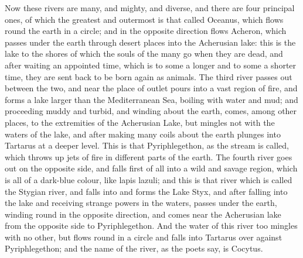 \documentclass[11pt,letter]{article}
\begin{document}
\par  Now these rivers are many, and mighty, and diverse, and there are four principal ones, of which the greatest and outermost is that called Oceanus, which flows round the earth in a circle; and in the opposite direction flows Acheron, which passes under the earth through desert places into the Acherusian lake: this is the lake to the shores of which the souls of the many go when they are dead, and after waiting an appointed time, which is to some a longer and to some a shorter time, they are sent back to be born again as animals. The third river passes out between the two, and near the place of outlet pours into a vast region of fire, and forms a lake larger than the Mediterranean Sea, boiling with water and mud; and proceeding muddy and turbid, and winding about the earth, comes, among other places, to the extremities of the Acherusian Lake, but mingles not with the waters of the lake, and after making many coils about the earth plunges into Tartarus at a deeper level. This is that Pyriphlegethon, as the stream is called, which throws up jets of fire in different parts of the earth. The fourth river goes out on the opposite side, and falls first of all into a wild and savage region, which is all of a dark-blue colour, like lapis lazuli; and this is that river which is called the Stygian river, and falls into and forms the Lake Styx, and after falling into the lake and receiving strange powers in the waters, passes under the earth, winding round in the opposite direction, and comes near the Acherusian lake from the opposite side to Pyriphlegethon. And the water of this river too mingles with no other, but flows round in a circle and falls into Tartarus over against Pyriphlegethon; and the name of the river, as the poets say, is Cocytus.
\end{document}
